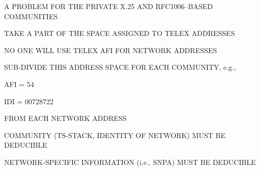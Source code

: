 \begin{bwslide}

\begin{nrtc}
\item	A PROBLEM FOR THE PRIVATE X.25 AND RFC1006--BASED COMMUNITIES

\item	TAKE A PART OF THE SPACE ASSIGNED TO TELEX ADDRESSES
    \begin{nrtc}
    \item	NO ONE WILL USE TELEX AFI FOR NETWORK ADDRESSES
    \end{nrtc}

\item	SUB-DIVIDE THIS ADDRESS SPACE FOR EACH COMMUNITY, e.g.,
    \begin{nrtc}
    \item	AFI = 54

    \item	IDI = 00728722
    \end{nrtc}
\end{nrtc}

\end{bwslide}


\begin{bwslide}

\begin{nrtc}
\item	FROM EACH NETWORK ADDRESS
    \begin{nrtc}
    \item	COMMUNITY (TS-STACK, IDENTITY OF NETWORK) MUST BE DEDUCIBLE

    \item	NETWORK-SPECIFIC INFORMATION (i.e., SNPA) MUST BE DEDUCIBLE
    \end{nrtc}
\end{nrtc}
\end{bwslide}


